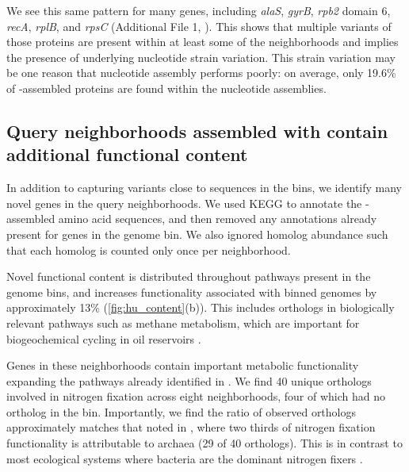 We see this same pattern for many genes, including {\em alaS}, {\em gyrB},
{\em rpb2}
domain 6, {\em recA}, {\em rplB}, and {\em rpsC} (Additional File 1, ).
This shows that multiple variants of those proteins are present within
at least some of the neighborhoods and implies the presence of
underlying nucleotide strain variation.
This strain variation may be
one reason that nucleotide assembly performs poorly: on average, only
19.6\% of \plass-assembled proteins are found within the nucleotide
assemblies.

\subsection*{Query neighborhoods assembled with \plass contain additional functional content}

In addition to capturing variants close to sequences in the bins, we
identify many novel genes in the query neighborhoods. We used KEGG to
annotate the \plass-assembled amino acid sequences, and then removed
any annotations already present for genes in the genome bin.  We also
ignored homolog abundance such that each homolog is counted only once
per neighborhood.

Novel functional content is distributed throughout pathways present in
the genome bins, and increases functionality associated with binned
genomes by approximately 13\% (\autoref{fig:hu_content}(b)).  This
includes orthologs in biologically relevant pathways
such as methane metabolism, which are important for biogeochemical
cycling in oil reservoirs \cite{Hu2016}.

Genes in these neighborhoods contain important metabolic functionality expanding
the pathways already identified in \cite{Hu2016}. We find 40
unique orthologs involved in nitrogen fixation across eight
neighborhoods, four of which had no ortholog in the bin.  Importantly,
we find the ratio of observed orthologs approximately matches that
noted in \cite{Hu2016}, where two thirds of nitrogen fixation
functionality is attributable to archaea (29 of 40 orthologs). This is
in contrast to most ecological systems where bacteria are the dominant
nitrogen fixers \cite{Hu2016}.
